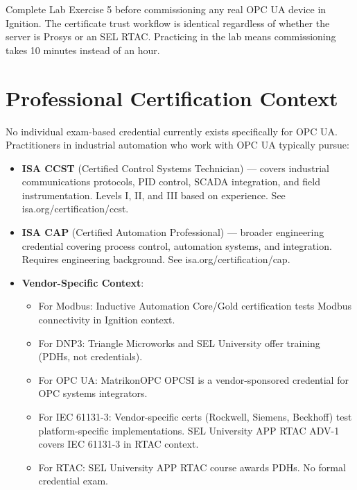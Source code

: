 \documentclass[12pt,twoside,openright]{memoir}
\begin{document}
\begin{protip}
Complete Lab Exercise 5 before commissioning any real OPC UA device in Ignition. The certificate trust workflow
is identical regardless of whether the server is Prosys or an SEL RTAC. Practicing in the lab means
commissioning takes 10 minutes instead of an hour.
\end{protip}

\section{Professional Certification Context}

No individual exam-based credential currently exists specifically for OPC UA. Practitioners in industrial automation who work with OPC UA typically pursue:

\begin{itemize}
\item \textbf{ISA CCST} (Certified Control Systems Technician) --- covers industrial communications protocols, PID control, SCADA integration, and field instrumentation. Levels I, II, and III based on experience. See isa.org/certification/ccst.
\item \textbf{ISA CAP} (Certified Automation Professional) --- broader engineering credential covering process control, automation systems, and integration. Requires engineering background. See isa.org/certification/cap.
\item \textbf{Vendor-Specific Context}:
  \begin{itemize}
  \item For Modbus: Inductive Automation Core/Gold certification tests Modbus connectivity in Ignition context.
  \item For DNP3: Triangle Microworks and SEL University offer training (PDHs, not credentials).
  \item For OPC UA: MatrikonOPC OPCSI is a vendor-sponsored credential for OPC systems integrators.
  \item For IEC 61131-3: Vendor-specific certs (Rockwell, Siemens, Beckhoff) test platform-specific implementations. SEL University APP RTAC ADV-1 covers IEC 61131-3 in RTAC context.
  \item For RTAC: SEL University APP RTAC course awards PDHs. No formal credential exam.
  \end{itemize}
\end{itemize}
\end{document}
